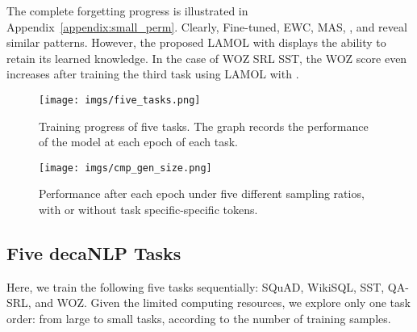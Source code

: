 \documentclass{article} \usepackage{iclr2020_conference,times}
\begin{document}
The complete forgetting progress is illustrated in Appendix~\ref{appendix:small_perm}.
Clearly, Fine-tuned, EWC, MAS, , and  reveal similar patterns.
However, the proposed LAMOL with  displays the ability to retain its learned knowledge.
In the case of 
WOZ  SRL  SST,  the WOZ score even increases after training the third task using LAMOL with .



\begin{comment}
\begin{figure}
   \begin{subfigure}[b]{0.45\textwidth}
    \texttt{[image: imgs/five\_tasks.png]}
    \caption{Training progress of five tasks. The graph records the performance of the model at each epoch of each task.
The task order is    SQuAD, WikiSQL, SST, QA-SRL and then WOZ.}
    \label{fig:five_tasks}
   \end{subfigure}
   \hfill
   \begin{subfigure}[b]{0.45\textwidth}
    \texttt{[image: imgs/cmp\_gen\_size.png]}
    \caption{Performance after each epoch under five different sampling ratios, with or without task specific-specific tokens. In total, ten combinations are tested on WikiSQL, SST, QA-SRL, and WOZ.}
    \label{fig:cmp_gen_size}
   \end{subfigure}
\end{figure}
\end{comment}

\begin{figure}[!t]
    \begin{minipage}{.45\textwidth}
        \centering
        \texttt{[image: imgs/five\_tasks.png]}
        \caption{Training progress of five tasks. The graph records the performance of the model at each epoch of each task.}
        \label{fig:five_tasks}
    \end{minipage}\hfill
    \begin{minipage}{.52\textwidth}
        \centering
        \texttt{[image: imgs/cmp\_gen\_size.png]}
        \caption{Performance after each epoch under five different sampling ratios, with or without task specific-specific tokens.}
        \label{fig:cmp_gen_size}
    \end{minipage}
\end{figure} 
\subsection{Five decaNLP Tasks}
Here, we train the following five tasks sequentially: SQuAD, WikiSQL, SST, QA-SRL, and WOZ.
Given the limited computing resources, we explore only one task order: from large to small tasks, according to the number of training samples.
\end{document}

